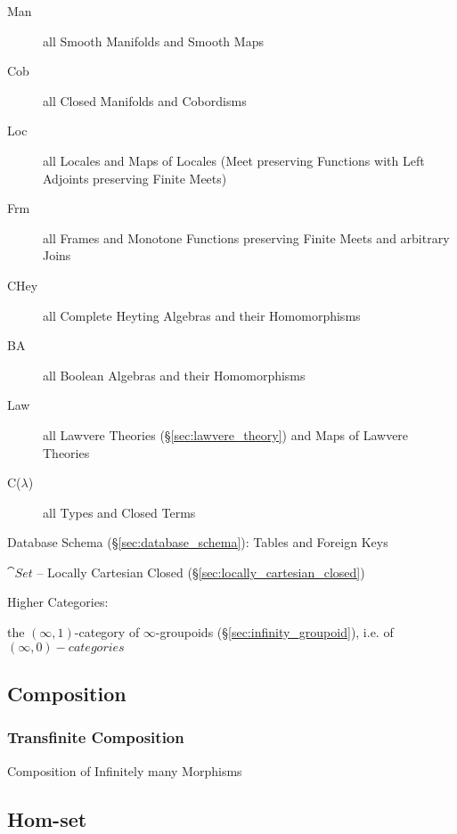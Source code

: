\begin{description}
\item [Man] all Smooth Manifolds and Smooth Maps
\item [Cob] all Closed Manifolds and Cobordisms
\item [Loc] all Locales and Maps of Locales (Meet preserving Functions
  with Left Adjoints preserving Finite Meets)
\item [Frm] all Frames and Monotone Functions preserving Finite Meets
  and arbitrary Joins
\item [CHey] all Complete Heyting Algebras and their Homomorphisms
\item [BA] all Boolean Algebras and their Homomorphisms
\item [Law] all Lawvere Theories (\S\ref{sec:lawvere_theory}) and Maps
  of Lawvere Theories
\item [C($\lambda$)] all Types and Closed Terms
\end{description}

Database Schema (\S\ref{sec:database_schema}): Tables and Foreign Keys

$\cat{Set}$ -- Locally Cartesian Closed
(\S\ref{sec:locally_cartesian_closed})

Higher Categories:


\item [$\infty$Grpd] the $(\infty,1)$-category of $\infty$-groupoids
  (\S\ref{sec:infinity_groupoid}), i.e. of $(\infty,0)-categories$



\subsection{Composition}\label{sec:composition}

\subsubsection{Transfinite Composition}
\label{sec:transfinite_composition}

Composition of Infinitely many Morphisms



\subsection{Hom-set}\label{sec:hom_set}

